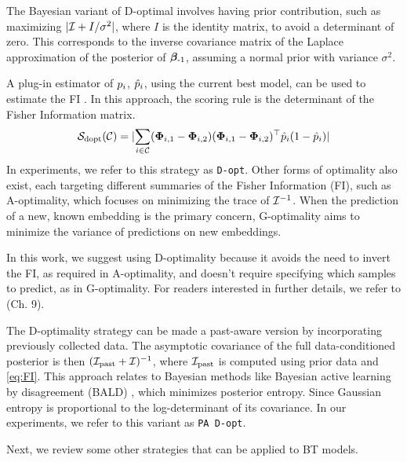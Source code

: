 The Bayesian variant of D-optimal involves having prior contribution, such as maximizing $|\mathcal{I} + I/\sigma^2|$, where $I$ is the identity matrix, to avoid a determinant of zero. This corresponds to the inverse covariance matrix of the Laplace approximation of the posterior of $\bm{\beta}_{\text{-1}}$, assuming a normal prior with variance $\sigma^2$.

A plug-in estimator of $p_{i}$, $\hat{p}_{i}$, using the current best model, can be used to estimate the FI \citep{chaloner1995bayesian, pukelsheim2006optimal}. In this approach, the scoring rule is the determinant of the Fisher Information matrix.
\begin{equation}
    \mathcal{S}_{\text{dopt}}(\mathcal{C}) = \lvert \sum_{i\in \mathcal{C}}  (\bm{\Phi}_{i,1}-\bm{\Phi}_{i,2})(\bm{\Phi}_{i,1}-\bm{\Phi}_{i,2})^\top \hat{p}_{i}(1-\hat{p}_{i})\rvert
\end{equation}
In experiments, we refer to this strategy as \texttt{D-opt}. Other forms of optimality also exist, each targeting different summaries of the Fisher Information (FI), such as A-optimality, which focuses on minimizing the trace of $\mathcal{I}^{-1}$. When the prediction of a new, known embedding is the primary concern, G-optimality aims to minimize the variance of predictions on new embeddings. %

In this work, we suggest using D-optimality because it avoids the need to invert the FI, as required in A-optimality, and doesn't require specifying which samples to predict, as in G-optimality. For readers interested in further details, we refer to \citet{pukelsheim2006optimal} (Ch. 9).

The D-optimality strategy can be made a past-aware version by incorporating previously collected data. The asymptotic covariance of the full data-conditioned posterior is then $(\mathcal{I}_{\text{past}} + \mathcal{I})^{-1}$, where $\mathcal{I}_{\text{past}}$ is computed using prior data and \cref{eq:FI}. This approach relates to Bayesian methods like Bayesian active learning by disagreement (BALD) \citep{houlsby2011bayesian}, which minimizes posterior entropy. Since Gaussian entropy is proportional to the log-determinant of its covariance. In our experiments, we refer to this variant as \texttt{PA D-opt}.

Next, we review some other strategies that can be applied to BT models.

